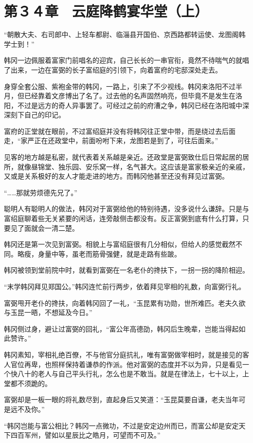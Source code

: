 \section{第３４章　云庭降鹤宴华堂（上）}

“朝散大夫、右司郎中、上轻车都尉、临淄县开国伯、京西路都转运使、龙图阁韩学士到！”

韩冈一边佩服着富家门前唱名的迎宾，自己长长的一串官衔，竟然不待喘气的就唱了出来，一边在富弼的长子富绍庭的引领下，向着富府的宅邸深处走去。

身穿全套公服、紫袍金带的韩冈，一路上，引来了不少视线。韩冈来洛阳不过半月，但已经靠着文彦博出了名了。过去他的名声固然响亮，但毕竟不是发生在洛阳，不过是远方的奇人异事罢了。可经过之前的府漕之争，韩冈已经在洛阳城中深深刻下自己的印记。

富府的正堂就在眼前，不过富绍庭并没有将韩冈往正堂中带，而是绕过去后面走，“家严正在还政堂中，前面吩咐下来，龙图若是到了，可往后面来。”

见客的地方越是私密，就代表着关系越是亲近。还政堂是富弼致仕后日常起居的居所，就像昼锦堂、独乐园、安乐窝一样，名气甚大。这应该是富家极亲近的亲戚，又或是关系极好的友人才能走进的地方。而韩冈他甚至还没有拜见过富弼。

“……那就劳烦德先兄了。”

聪明人有聪明人的做法，韩冈对于富弼给他的特别待遇，没多说什么谦辞。只是与富绍庭聊着些无关紧要的闲话，连旁敲侧击都没有。反正富弼到底有什么打算，只要见了面就会一清二楚。

韩冈还是第一次见到富弼。相貌上与富绍庭很有几分相似，但给人的感觉截然不同。略瘦，身量中等，虽老而筋骨强健，就是走路有些跛。

韩冈被领到堂前院中时，就看到富弼在一名老仆的搀扶下，一拐一拐的降阶相迎。

“末学韩冈拜见郑国公。”韩冈连忙前行两步，依着拜见宰相的礼数，向富弼行礼。

富弼甩开老仆的搀扶，向着韩冈回了一礼，“玉昆累有功勋，世所难匹。老夫久欲与玉昆一晤，不想延及今日。”

韩冈侧过身，避让过富弼的回礼，“富公年高德劭，韩冈后生晚辈，岂能当得起如此赞许。”

韩冈素知，宰相礼绝百僚，不与他官分庭抗礼，唯有富弼做宰相时，就是接见的客人官位再卑，也照样保持着谦恭的作派。他对富弼的态度并不以为异，只是看见一个快八十的老人与自己平头行礼，怎么也是不敢当。就是在律法上，七十以上，上堂都不须跪的。

富弼却是一板一眼的将礼数尽到，直起身后又笑道：“玉昆莫要自谦，老夫当年可是远不及你。”

“韩冈岂能与富公相比？韩冈一点微功，不过是安定边州而已，而富公却是安定天下四百军州，譬如以星辰比之皓月，可望而不可及。”

